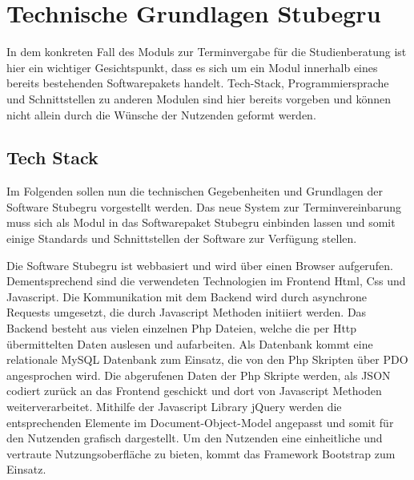 \section{Technische Grundlagen Stubegru}
In dem konkreten Fall des Moduls zur Terminvergabe für die Studienberatung ist
hier ein wichtiger Gesichtspunkt, dass es sich um ein Modul innerhalb eines
bereits bestehenden Softwarepakets handelt. \gls{Tech-Stack},
Programmiersprache und Schnittstellen zu anderen Modulen sind hier bereits
vorgeben und können nicht allein durch die Wünsche der Nutzenden geformt
werden.

\subsection*{Tech Stack}
Im Folgenden sollen nun die technischen Gegebenheiten und Grundlagen der
Software Stubegru vorgestellt werden. Das neue System zur Terminvereinbarung
muss sich als Modul in das Softwarepaket Stubegru einbinden lassen und somit
einige Standards und Schnittstellen der Software zur Verfügung stellen.

Die Software Stubegru ist webbasiert und wird über einen Browser aufgerufen.
Dementsprechend sind die verwendeten Technologien im Frontend \gls{Html},
\gls{Css} und \gls{Javascript}. Die Kommunikation mit dem Backend wird durch
asynchrone Requests umgesetzt, die durch Javascript Methoden initiiert werden.
Das Backend besteht aus vielen einzelnen \gls{Php} Dateien, welche die per
\gls{Http} übermittelten Daten auslesen und aufarbeiten. Als Datenbank kommt
eine relationale \gls{MySQL} Datenbank zum Einsatz, die von den Php Skripten
über \gls{PDO} angesprochen wird. Die abgerufenen Daten der Php Skripte werden,
als \gls{JSON} codiert zurück an das Frontend geschickt und dort von Javascript
Methoden weiterverarbeitet. Mithilfe der Javascript Library \gls{jQuery} werden
die entsprechenden Elemente im \gls{Document-Object-Model} angepasst und somit
für den Nutzenden grafisch dargestellt. Um den Nutzenden eine einheitliche und
vertraute Nutzungsoberfläche zu bieten, kommt das Framework \gls{Bootstrap} zum
Einsatz.

